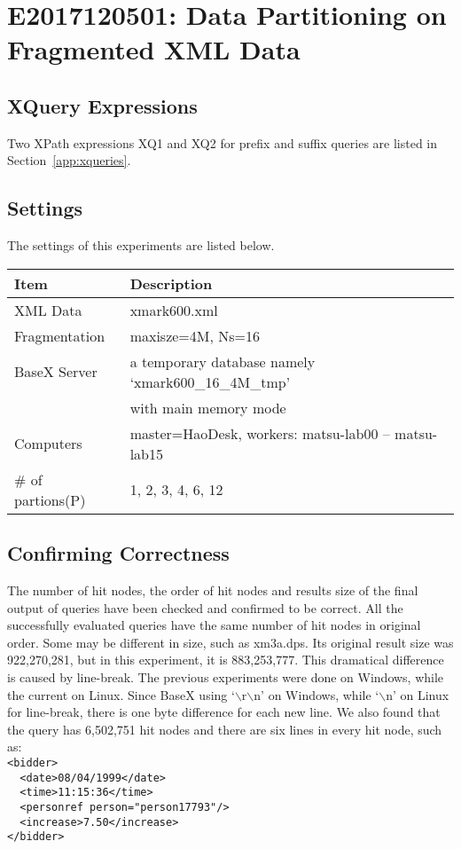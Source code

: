 

\section{E2017120501: Data Partitioning on Fragmented XML Data}

\subsection{XQuery Expressions}

Two XPath expressions XQ1 and XQ2 for prefix and suffix queries 
are listed in Section~\ref{app:xqueries}.


\subsection{Settings}

The settings of this experiments are listed below.

\begin{tabular}{l|l}
    \hline
    \textbf{Item} & \textbf{Description }\\
    \hline
    XML Data & xmark600.xml \\
    \hline
    Fragmentation & maxisze=4M, Ns=16\\
    \hline
	BaseX Server & a temporary database namely `xmark600\_16\_4M\_tmp'\\
	& with main memory mode\\ 
	\hline
	Computers&  master=HaoDesk, workers: matsu-lab00 -- matsu-lab15\\
	\hline
	\# of partions(P) &  1, 2, 3, 4, 6, 12\\
    \hline
\end{tabular}	


\subsection{Confirming Correctness}

The number of hit nodes, the order of hit nodes and results size of
the final output of queries have been checked and confirmed to be correct. 
All the successfully evaluated queries 
have the same number of hit nodes in original order. Some may be 
different in size, such as xm3a.dps. Its original result size
was 922,270,281, but in this experiment, it is 883,253,777.
This dramatical difference is caused by line-break. The previous 
experiments were done on Windows, while the current on Linux. 
Since BaseX using `$\backslash$r$\backslash$n' on Windows, while
 `$\backslash$n' on Linux for line-break, there is one byte 
difference for each new line. We also found that the query has 
6,502,751 hit nodes and  there are six lines in every hit node, 
such as:\\
\verb|<bidder>|\\
\verb|  <date>08/04/1999</date>|\\
\verb|  <time>11:15:36</time>|\\
\verb|  <personref person="person17793"/>|\\
\verb|  <increase>7.50</increase>|\\
\verb|</bidder>|\\

